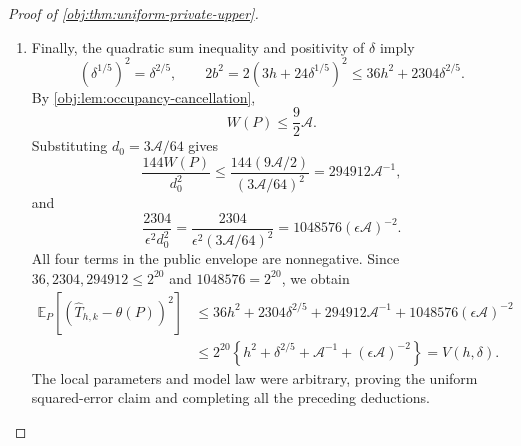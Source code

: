 \documentclass[11pt]{article}
\begin{document}
\begin{proof}[Proof of \cref{obj:thm:uniform-private-upper}]
\begin{enumerate}
\item
Finally, the quadratic sum inequality and positivity of \(\delta\) imply
\[
(\delta^{1/5})^2=\delta^{2/5},
\qquad
2b^2
=2(3h+24\delta^{1/5})^2
\le36h^2+2304\delta^{2/5}.
\]
By \cref{obj:lem:occupancy-cancellation},
\[
W(P)\le\frac92\mathcal A.
\]
Substituting \(d_0=3\mathcal A/64\) gives
\[
\frac{144W(P)}{d_0^2}
\le
\frac{144(9\mathcal A/2)}{(3\mathcal A/64)^2}
=294912\mathcal A^{-1},
\]
and
\[
\frac{2304}{\epsilon^2d_0^2}
=
\frac{2304}{\epsilon^2(3\mathcal A/64)^2}
=1048576(\epsilon\mathcal A)^{-2}.
\]
All four terms in the public envelope are nonnegative. Since
\(36,2304,294912\le2^{20}\) and \(1048576=2^{20}\), we obtain
\[
\begin{aligned}
\mathbb E_P[(\widehat T_{h,k}-\theta(P))^2]
&\le
36h^2+2304\delta^{2/5}
+294912\mathcal A^{-1}
+1048576(\epsilon\mathcal A)^{-2}\\
&\le
2^{20}\left\{
h^2+\delta^{2/5}+\mathcal A^{-1}
+(\epsilon\mathcal A)^{-2}
\right\}
=V(h,\delta).
\end{aligned}
\]
The local parameters and model law were arbitrary, proving the uniform squared-error claim and completing all the preceding deductions.
\end{enumerate}
\end{proof}
\end{document}
